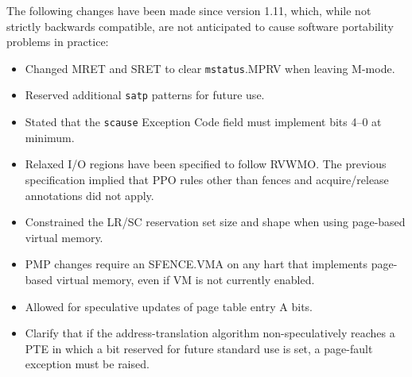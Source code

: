 The following changes have been made since version 1.11, which, while not
strictly backwards compatible, are not anticipated to cause software
portability problems in practice:
\vspace{-0.2in}
\begin{itemize}
  \parskip 0pt
  \itemsep 1pt
\item Changed MRET and SRET to clear {\tt mstatus}.MPRV when leaving M-mode.
\item Reserved additional {\tt satp} patterns for future use.
\item Stated that the {\tt scause} Exception Code field must implement
  bits 4--0 at minimum.
\item Relaxed I/O regions have been specified to follow RVWMO.  The previous
  specification implied that PPO rules other than fences and acquire/release
  annotations did not apply.
\item Constrained the LR/SC reservation set size and shape when using
  page-based virtual memory.
\item PMP changes require an SFENCE.VMA on any hart that implements
  page-based virtual memory, even if VM is not currently enabled.
\item Allowed for speculative updates of page table entry A bits.
\item Clarify that if the address-translation algorithm non-speculatively
  reaches a PTE in which a bit reserved for future standard use is set,
  a page-fault exception must be raised.
\end{itemize}

